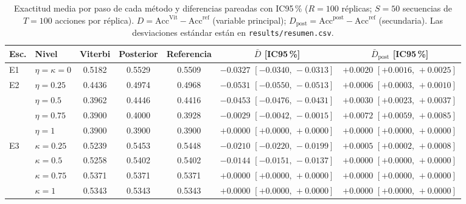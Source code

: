 \begin{table}[ht]
\centering
\caption{Exactitud media por paso de cada método y diferencias pareadas con IC95\,\% ($R=100$ réplicas; $S=50$ secuencias de $T=100$ acciones por réplica). $D=\mathrm{Acc}^{\mathrm{Vit}}-\mathrm{Acc}^{\mathrm{ref}}$ (variable principal); $D_{\mathrm{post}}=\mathrm{Acc}^{\mathrm{post}}-\mathrm{Acc}^{\mathrm{ref}}$ (secundaria). Las desviaciones estándar están en \texttt{results/resumen.csv}.}
\label{tab:res}
\footnotesize
\setlength{\tabcolsep}{4pt}
\begin{adjustbox}{max width=\textwidth}
\begin{tabular}{llccccc}
\toprule
Esc. & Nivel & Viterbi & Posterior & Referencia & $\bar D$ [IC95\,\%] & $\bar D_{\mathrm{post}}$ [IC95\,\%] \\
\midrule
E1 & $\eta=\kappa=0$ & 0.5182 & 0.5529 & 0.5509 & $-0.0327$ $[-0.0340,\,-0.0313]$ & $+0.0020$ $[+0.0016,\,+0.0025]$ \\
\midrule
E2 & $\eta=0.25$ & 0.4436 & 0.4974 & 0.4968 & $-0.0531$ $[-0.0550,\,-0.0513]$ & $+0.0006$ $[+0.0003,\,+0.0010]$ \\
 & $\eta=0.5$ & 0.3962 & 0.4446 & 0.4416 & $-0.0453$ $[-0.0476,\,-0.0431]$ & $+0.0030$ $[+0.0023,\,+0.0037]$ \\
 & $\eta=0.75$ & 0.3900 & 0.4000 & 0.3928 & $-0.0029$ $[-0.0042,\,-0.0015]$ & $+0.0072$ $[+0.0059,\,+0.0085]$ \\
 & $\eta=1$ & 0.3900 & 0.3900 & 0.3900 & $+0.0000$ $[+0.0000,\,+0.0000]$ & $+0.0000$ $[+0.0000,\,+0.0000]$ \\
\midrule
E3 & $\kappa=0.25$ & 0.5239 & 0.5453 & 0.5448 & $-0.0210$ $[-0.0220,\,-0.0199]$ & $+0.0005$ $[+0.0002,\,+0.0008]$ \\
 & $\kappa=0.5$ & 0.5258 & 0.5402 & 0.5402 & $-0.0144$ $[-0.0151,\,-0.0137]$ & $+0.0000$ $[+0.0000,\,+0.0000]$ \\
 & $\kappa=0.75$ & 0.5371 & 0.5371 & 0.5371 & $+0.0000$ $[+0.0000,\,+0.0000]$ & $+0.0000$ $[+0.0000,\,+0.0000]$ \\
 & $\kappa=1$ & 0.5343 & 0.5343 & 0.5343 & $+0.0000$ $[+0.0000,\,+0.0000]$ & $+0.0000$ $[+0.0000,\,+0.0000]$ \\
\bottomrule
\end{tabular}
\end{adjustbox}
\end{table}

